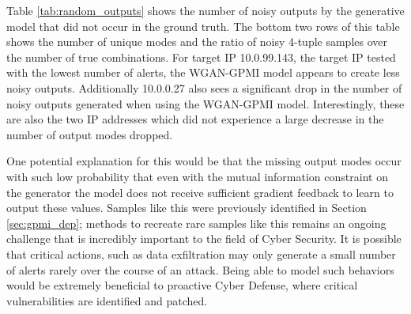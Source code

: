 Table \ref{tab:random_outputs} shows the number of noisy outputs by the generative model that did not occur in the ground truth. The bottom two rows of this table shows the number of unique modes and the ratio of noisy 4-tuple samples over the number of true combinations.  For target IP 10.0.99.143, the target IP tested with the lowest number of alerts, the WGAN-GPMI model appears to create less noisy outputs. Additionally 10.0.0.27 also sees a significant drop in the number of noisy outputs generated when using the WGAN-GPMI model. Interestingly, these are also the two IP addresses which did not experience a large decrease in the number of output modes dropped.

One potential explanation for this would be that the missing output modes occur with such low probability that even with the mutual information constraint on the generator the model does not receive sufficient gradient feedback to learn to output these values. Samples like this were previously identified in Section \ref{sec:gpmi_dep}; methods to recreate rare samples like this remains an ongoing challenge that is incredibly important to the field of Cyber Security. It is possible that critical actions, such as data exfiltration may only generate a small number of alerts rarely over the course of an attack. Being able to model such behaviors would be extremely beneficial to proactive Cyber Defense, where critical vulnerabilities are identified and patched.

